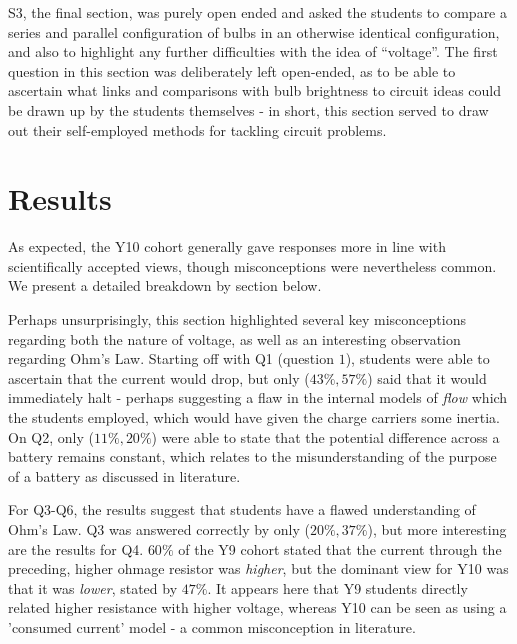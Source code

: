 \documentclass[a4paper,openany,nobib]{tufte-book}
\begin{document}
S3, the final section, was purely open ended and asked the students to compare a series and parallel configuration of bulbs in an otherwise identical configuration, and also to highlight any further difficulties with the idea of ``voltage''.
The first question in this section was deliberately left open-ended, as to be able to ascertain what links and comparisons with bulb brightness to circuit ideas could be drawn up by the students themselves - in short, this section served to draw out their self-employed methods for tackling circuit problems.
\chapter{Results}
As expected, the Y10 cohort generally gave responses more in line with scientifically accepted views, though misconceptions were nevertheless common. We present a detailed breakdown by section below.

Perhaps unsurprisingly, this section highlighted several key misconceptions regarding both the nature of voltage, as well as an interesting observation regarding Ohm's Law. 
Starting off with Q1 (question $1$), students were able to ascertain that the current would drop,
but only ($43\%,57\%$) said that it would immediately halt - perhaps suggesting a flaw in the internal models of \emph{flow} which the students employed, which would have given the charge carriers some inertia. 
On Q2, only ($11\%, 20\%$) were able to state that the potential difference across a battery remains constant, which relates to the misunderstanding of the purpose of a battery as discussed in {literature\autocite{shipstone_children}}. 

For Q3-Q6, the results suggest that students have a flawed understanding of Ohm's Law. Q3 was answered correctly by only ($20\%,37\%$), but more interesting are the results for Q4. $60\%$ of the Y9 cohort stated that the current through the preceding, higher ohmage resistor was \emph{higher}, but the dominant view for Y10 was that it was \emph{lower}, stated by $47\%$. It appears here that Y9 students directly related higher resistance with higher voltage, whereas Y10 can be seen as using a 'consumed current' model - a common misconception in literature.
\end{document}
